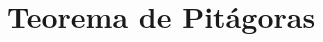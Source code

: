 \documentclass[12pt,addpoints]{repaso}
\begin{document}
\begin{questions}
{\begin{multicols}{3}
        \end{multicols}
    }


    \section{Teorema de Pitágoras}



\end{questions}
\end{document}
